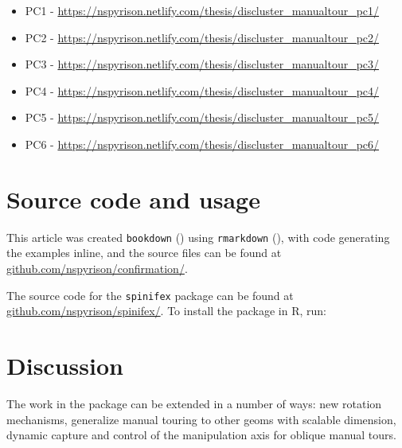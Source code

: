 \documentclass{monashthesis}
\begin{document}
\begin{itemize}
\tightlist
\item
  PC1 -
  \url{https://nspyrison.netlify.com/thesis/discluster_manualtour_pc1/}
\item
  PC2 -
  \url{https://nspyrison.netlify.com/thesis/discluster_manualtour_pc2/}
\item
  PC3 -
  \url{https://nspyrison.netlify.com/thesis/discluster_manualtour_pc3/}
\item
  PC4 -
  \url{https://nspyrison.netlify.com/thesis/discluster_manualtour_pc4/}
\item
  PC5 -
  \url{https://nspyrison.netlify.com/thesis/discluster_manualtour_pc5/}
\item
  PC6 -
  \url{https://nspyrison.netlify.com/thesis/discluster_manualtour_pc6/}
\end{itemize}

\section{Source code and usage}\label{source-code-and-usage}

This article was created \texttt{bookdown}
(\textcite{xie_bookdown:_2016}) using \texttt{rmarkdown}
(\textcite{xie_r_2018}), with code generating the examples inline, and
the source files can be found at
\href{https://github.com/nspyrison/confirmation/}{github.com/nspyrison/confirmation/}.

The source code for the \texttt{spinifex} package can be found at
\href{https://github.com/nspyrison/spinifex/}{github.com/nspyrison/spinifex/}.
To install the package in R, run:

\begin{Shaded}
\begin{Highlighting}[]
\OperatorTok{::}\NormalTok{(}\NormalTok{)}
\end{Highlighting}
\end{Shaded}

\section{Discussion}\label{discussion}

The work in the package can be extended in a number of ways: new
rotation mechanisms, generalize manual touring to other geoms with
scalable dimension, dynamic capture and control of the manipulation axis
for oblique manual tours.
\end{document}
